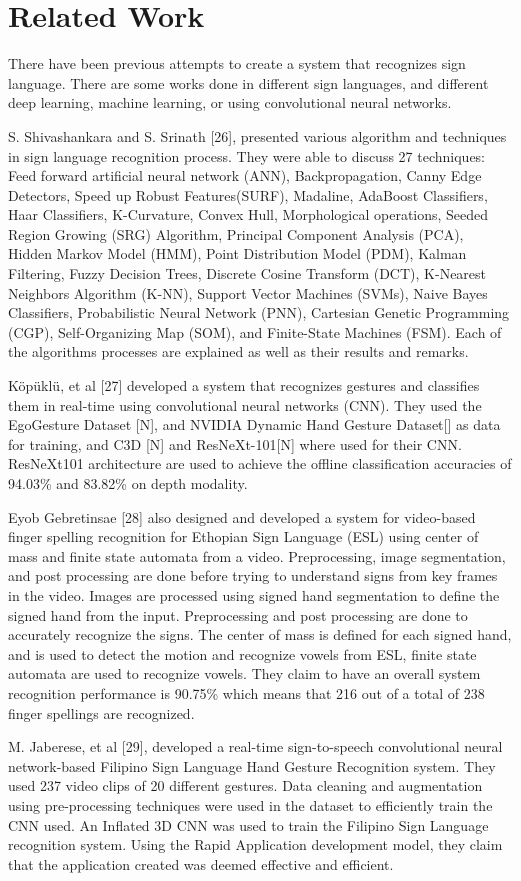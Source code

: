 \documentclass[journal]{./IEEE/IEEEtran}
\begin{document}
\section{Related Work}
\par
There have been previous attempts to create a system that recognizes sign language. There are some works done in different sign languages, and different deep learning, machine learning, or using convolutional neural networks.
\par
S. Shivashankara and S. Srinath [26], presented various algorithm and techniques in sign language recognition process. They were able to discuss 27 techniques:  Feed forward artificial neural network (ANN), Backpropagation, Canny Edge Detectors, Speed up Robust Features(SURF), Madaline, AdaBoost Classifiers, Haar Classifiers, K-Curvature, Convex Hull, Morphological operations, Seeded Region Growing (SRG) Algorithm, Principal Component Analysis (PCA), Hidden Markov Model (HMM),  Point Distribution Model (PDM), Kalman Filtering,  Fuzzy Decision Trees, Discrete Cosine Transform (DCT), K-Nearest Neighbors Algorithm (K-NN), Support Vector Machines (SVMs), Naive Bayes Classifiers, Probabilistic Neural Network (PNN), Cartesian Genetic Programming (CGP), Self-Organizing Map (SOM), and Finite-State Machines (FSM). Each of the algorithms processes are explained as well as their results and remarks. 
\par
Köpüklü, et al [27] developed a system that recognizes gestures and classifies them in real-time using convolutional neural networks (CNN). They used the EgoGesture Dataset [N], and NVIDIA Dynamic Hand Gesture Dataset[] as data for training, and C3D [N] and ResNeXt-101[N] where used for their CNN. ResNeXt101 architecture are used to achieve the offline classification accuracies of 94.03\% and 83.82\% on depth modality.
\par
Eyob Gebretinsae [28] also designed and developed a system for video-based finger spelling recognition for Ethopian Sign Language (ESL) using center of mass and finite state automata from a video. Preprocessing, image segmentation, and post processing are done before trying to understand signs from key frames in the video. Images are processed using signed hand segmentation to define the signed hand from the input. Preprocessing and post processing are done to accurately recognize the signs. The center of mass is defined for each signed hand, and is used to detect the motion and recognize vowels from ESL, finite state automata are used to recognize vowels. They claim to have an overall system recognition performance is 90.75\% which means that 216 out of a total of 238 finger spellings are recognized. 
\par
M. Jaberese, et al [29], developed a real-time sign-to-speech convolutional neural network-based Filipino Sign Language Hand Gesture Recognition system. They used 237 video clips of 20 different gestures. Data cleaning and augmentation using pre-processing techniques were used in the dataset to efficiently train the CNN used. An Inflated 3D CNN was used to train the Filipino Sign Language recognition system. Using the Rapid Application development model, they claim that the application created was deemed effective and efficient.
\end{document}

